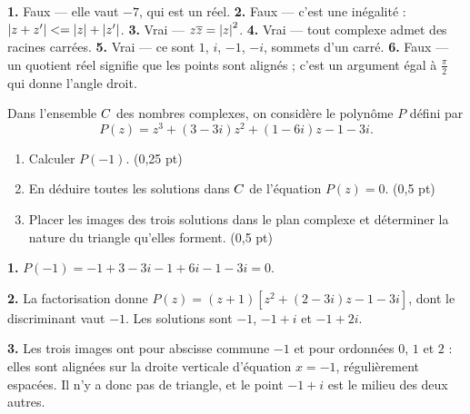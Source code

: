 \begin{corrige}[je me teste]
\textbf{1.} Faux — elle vaut $-7$, qui est un réel.
\textbf{2.} Faux — c'est une inégalité : $\left|z+z'\right| <= \left|z\right|+\left|z'\right|$.
\textbf{3.} Vrai — $z\overline z = \left|z\right|^{2}$.
\textbf{4.} Vrai — tout complexe admet des racines carrées.
\textbf{5.} Vrai — ce sont $1$, $i$, $-1$, $-i$, sommets d'un carré.
\textbf{6.} Faux — un quotient réel signifie que les points sont alignés ;
c'est un argument égal à $\frac{\pi}{2}$ qui donne l'angle droit.
\end{corrige}

\begin{commeaubac}
Dans l'ensemble $C$ des nombres complexes, on considère le polynôme $P$
défini par
\[
  P(z) = z^{3}+(3-3i)z^{2}+(1-6i)z-1-3i .
\]

\begin{enumerate}[label=\textbf{\arabic*.}, leftmargin=*, itemsep=0.25em]
  \item Calculer $P(-1)$. \hfill\textup{(0,25 pt)}
  \item En déduire toutes les solutions dans $C$ de l'équation $P(z) = 0$.
        \hfill\textup{(0,5 pt)}
  \item Placer les images des trois solutions dans le plan complexe et
        déterminer la nature du triangle qu'elles forment.
        \hfill\textup{(0,5 pt)}
\end{enumerate}
\end{commeaubac}

\begin{corrige}
\textbf{1.} $P(-1) = -1+3-3i-1+6i-1-3i = 0$.

\textbf{2.} La factorisation donne
$P(z) = (z+1)\left[z^{2}+(2-3i)z-1-3i\right]$, dont le discriminant vaut
$-1$. Les solutions sont $-1$, $-1+i$ et $-1+2i$.

\textbf{3.} Les trois images ont pour abscisse commune $-1$ et pour ordonnées
$0$, $1$ et $2$ : elles sont alignées sur la droite verticale d'équation
$x = -1$, régulièrement espacées. Il n'y a donc pas de triangle, et le point
$-1+i$ est le milieu des deux autres.
\end{corrige}

